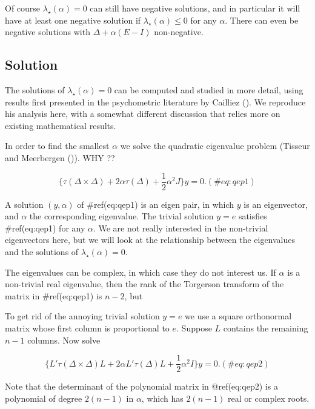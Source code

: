 \documentclass[
  12pt,
  letterpaper,
  DIV=11,
  numbers=noendperiod]{scrreprt}
\theoremstyle{remark}
\begin{document}
Of course \(\lambda_\star(\alpha)=0\) can still have negative solutions,
and in particular it will have at least one negative solution if
\(\lambda_\star(\alpha)\leq 0\) for any \(\alpha\). There can even be
negative solutions with \(\Delta+\alpha(E-I)\) non-negative.

\subsection{Solution}\label{solution}

The solutions of \(\lambda_\star(\alpha)=0\) can be computed and studied
in more detail, using results first presented in the psychometric
literature by Cailliez (). We reproduce
his analysis here, with a somewhat different discussion that relies more
on existing mathematical results.

In order to find the smallest \(\alpha\) we solve the quadratic
eigenvalue problem (Tisseur and Meerbergen
()). WHY ??

\begin{equation}
\{\tau(\Delta\times\Delta)+2\alpha\tau(\Delta)+\frac12\alpha^2J\}y=0.
(\#eq:qep1)
\end{equation}

A solution \((y,\alpha)\) of \#ref(eq:qep1) is an eigen pair, in which
\(y\) is an eigenvector, and \(\alpha\) the corresponding eigenvalue.
The trivial solution \(y=e\) satisfies \#ref(eq:qep1) for any
\(\alpha\). We are not really interested in the non-trivial eigenvectors
here, but we will look at the relationship between the eigenvalues and
the solutions of \(\lambda_\star(\alpha)=0\).

The eigenvalues can be complex, in which case they do not interest us.
If \(\alpha\) is a non-trivial real eigenvalue, then the rank of the
Torgerson transform of the matrix in \#ref(eq:qep1) is \(n-2\), but

To get rid of the annoying trivial solution \(y=e\) we use a square
orthonormal matrix whose first column is proportional to \(e\). Suppose
\(L\) contains the remaining \(n-1\) columns. Now solve

\begin{equation}
\{L'\tau(\Delta\times\Delta)L+2\alpha L'\tau(\Delta)L+\frac12\alpha^2I\}y=0.
(\#eq:qep2)
\end{equation}

Note that the determinant of the polynomial matrix in @ref(eq:qep2) is a
polynomial of degree \(2(n-1)\) in \(\alpha\), which has \(2(n-1)\) real
or complex roots.
\end{document}
